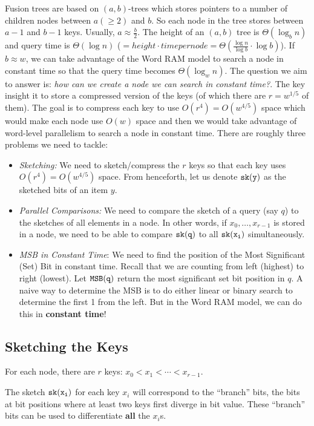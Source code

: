 \documentclass[11pt]{article}
\newcommand{\sk}[1]{{\tt{sk}(#1)}}
\newcommand{\MSB}[1]{{\tt{MSB}(#1)}}
\begin{document}
Fusion trees are based on $(a,b)$-trees which stores pointers to
a number of children nodes between $a (\geq 2)$ and $b$. So each node
in the tree stores between $a-1$ and $b-1$ keys. Usually,
$a\approx\frac{b}{2}$. The height of an $(a,b)$ tree is
$\Theta(\log_b n)$ and query time is
$\Theta(\log n)$
($=height\cdot time per node = \Theta(\frac{\log n}{\log b}\cdot \log b)$).
If $b\approx w$, we can take advantage of the Word RAM model to search
a node in constant time so that the query time becomes
$\Theta(\log_w n)$. The question we aim to answer is:
\textit{how can we create a node we can search in constant time?}. The
key insight it to store a
compressed version of the keys (of which there are
$r=w^{1/5}$ of them). The goal is to compress each key to use
$O(r^4) = O(w^{4/5})$ space which would make each node use $O(w)$ space
and then we would take advantage of word-level parallelism to search a node
in constant time. There are roughly three problems we need to tackle:
\begin{itemize}
\item
  \textit{Sketching:} We need to sketch/compress the $r$ keys so that
  each key uses $O(r^4) = O(w^{4/5})$ space. From henceforth, let us
  denote $\sk{y}$ as the sketched bits of an item $y$.
\item
  \textit{Parallel Comparisons:} We need to compare the sketch of
  a query (say $q$) to the sketches of all elements in a node. In
  other words, if $x_0, \ldots, x_{r-1}$ is stored in a node, we need to
  be able to compare $\sk{q}$ to all $\sk{x_i}$ simultaneously.
\item
  \textit{MSB in Constant Time}: We need to find the position of the
  Most Significant (Set) Bit in constant time. Recall that we are counting
  from left (highest) to right (lowest). Let $\MSB{q}$ return the most
  significant set bit position in $q$. A naive way to determine the MSB
  is to do either linear or binary search to determine the first 1 from
  the left. But in the Word RAM model, we can do this in
  \textbf{constant time}!
\end{itemize}

\subsection{Sketching the Keys}

For each node, there are $r$ keys:
$x_0 < x_1 < \cdots < x_{r-1}$.

The sketch $\sk{x_i}$ for each key $x_i$
will correspond to the ``branch'' bits, the bits at
bit positions where at least two keys first diverge in bit value.
These ``branch'' bits can be used to differentiate \textbf{all}
the $x_i$s.
\end{document}
